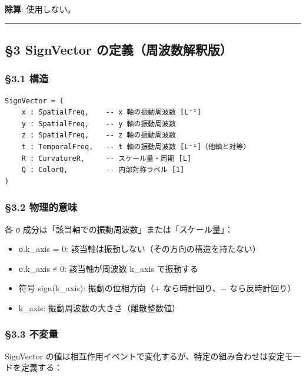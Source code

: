 \documentclass[a4paper,11pt]{ltjsarticle}
\providecommand{\tightlist}{\setlength{\itemsep}{0pt}\setlength{\parskip}{0pt}}
\begin{document}
\textbf{除算}: 使用しない。

\begin{center}\rule{0.5\linewidth}{0.5pt}\end{center}

\subsection{§3 SignVector
の定義（周波数解釈版）}\label{signvector-ux306eux5b9aux7fa9ux5468ux6ce2ux6570ux89e3ux91c8ux7248}

\subsubsection{§3.1 構造}\label{ux69cbux9020}

\begin{verbatim}
SignVector = (
    x : SpatialFreq,    -- x 軸の振動周波数 [L⁻¹]
    y : SpatialFreq,    -- y 軸の振動周波数
    z : SpatialFreq,    -- z 軸の振動周波数
    t : TemporalFreq,   -- t 軸の振動周波数 [L⁻¹]（他軸と対等）
    R : CurvatureR,     -- スケール量・周期 [L]
    Q : ColorQ,         -- 内部対称ラベル [1]
)
\end{verbatim}

\subsubsection{§3.2 物理的意味}\label{ux7269ux7406ux7684ux610fux5473}

各 σ 成分は「該当軸での振動周波数」または「スケール量」：

\begin{itemize}
\tightlist
\item
  σ.k\_axis = 0: 該当軸は振動しない（その方向の構造を持たない）
\item
  σ.k\_axis ≠ 0: 該当軸が周波数 \textbar k\_axis\textbar{} で振動する
\item
  符号 sign(k\_axis): 振動の位相方向（+ なら時計回り、− なら反時計回り）
\item
  \textbar k\_axis\textbar: 振動周波数の大きさ（離散整数値）
\end{itemize}

\subsubsection{§3.3 不変量}\label{ux4e0dux5909ux91cf}

SignVector
の値は相互作用イベントで変化するが、特定の組み合わせは安定モードを定義する：
\end{document}
